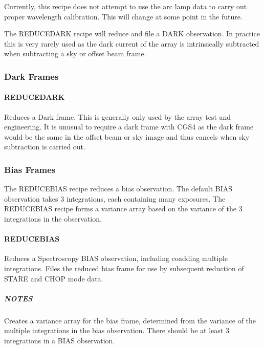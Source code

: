 \documentclass[twoside,11pt]{article}
\renewcommand{\_}{\texttt{\symbol{95}}}
\begin{document}
Currently, this recipe does not attempt to use the arc lamp data to
carry out proper wavelength calibration. This will change at some
point in the future.


The REDUCE\_DARK recipe will reduce and file a DARK observation. In
practice this is very rarely used as the dark current of the array is
intrinsically subtracted when subtracting a sky or offset beam frame.

\subsubsection{Dark Frames}


\paragraph*{REDUCE\_DARK\label{REDUCE_DARK}}



\mbox{}

Reduces a Dark frame. This is generally only used by the array test
and engineering. It is unusual to require a dark frame with CGS4 as
the dark frame would be the same in the offset beam or sky image and
thus cancels when sky subtraction is carried out.


\subsubsection{Bias Frames}

The REDUCE\_BIAS recipe reduces a bias observation. The default BIAS
observation takes 3 integrations, each containing many exposures. The
REDUCE\_BIAS recipe forms a variance array based on the variance of the
3 integrations in the observation.


\paragraph*{REDUCE\_BIAS\label{REDUCE_BIAS}}

\mbox{}

Reduces a Spectroscopy BIAS observation, including coadding multiple
integrations. Files the reduced bias frame for use by subsequent
reduction of STARE and CHOP mode data.

\subparagraph*{NOTES\label{REDUCE_BIAS_NOTES}}

Creates a variance array for the bias frame, determined from the 
variance of the multiple integrations in the bias observation. There
should be at least 3 integrations in a BIAS observation.
\end{document}
